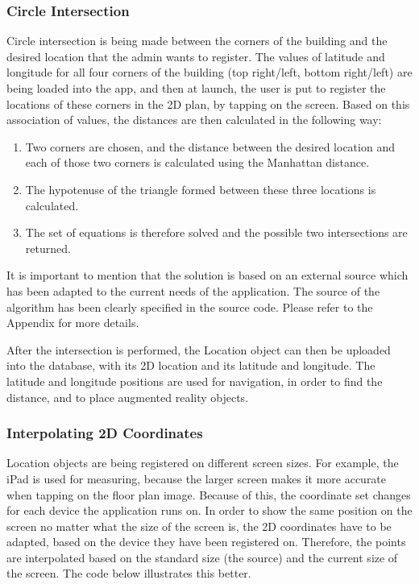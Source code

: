 \subsubsection*{Circle Intersection}
Circle intersection is being made between the corners of the building and the desired location that the admin wants to register. The values of latitude and longitude for all four corners of the building (top right/left, bottom right/left) are being loaded into the app, and then at launch, the user is put to register the locations of these corners in the 2D plan, by tapping on the screen. Based on this association of values, the distances are then calculated in the following way:
\begin{enumerate}
    \item Two corners are chosen, and the distance between the desired location and each of those two corners is calculated using the Manhattan distance.
    \item The hypotenuse of the triangle formed between these three locations is calculated.
    \item The set of equations is therefore solved and the possible two intersections are returned.
\end{enumerate}

It is important to mention that the solution is based on an external source which has been adapted to the current needs of the application. The source of the algorithm has been clearly specified in the source code. Please refer to the Appendix for more details.

After the intersection is performed, the Location object can then be uploaded into the database, with its 2D location and its latitude and longitude. The latitude and longitude positions are used for navigation, in order to find the distance, and to place augmented reality objects.

\subsubsection*{Interpolating 2D Coordinates}
Location objects are being registered on different screen sizes. For example, the iPad is used for measuring, because the larger screen makes it more accurate when tapping on the floor plan image. Because of this, the coordinate set changes for each device the application runs on. In order to show the same position on the screen no matter what the size of the screen is, the 2D coordinates have to be adapted, based on the device they have been registered on. Therefore, the points are interpolated based on the standard size (the source) and the current size of the screen. The code below illustrates this better.

